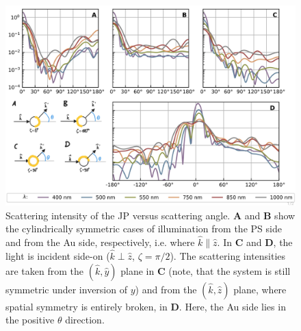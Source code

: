 \documentclass[10pt]{article}
\begin{document}
\begin{figure}[b!]
    \centering
    \includegraphics[width=\textwidth]{[fig] cartesian mieplots (placeholder).jpg}
    \caption{Scattering intensity of the JP versus scattering angle. 
    {\sffamily\bfseries A} and {\sffamily\bfseries B} show the cylindrically symmetric cases of illumination from the PS side and from the Au side, respectively, i.e. where $\hat{k}\parallel\hat{z}$. 
    In {\sffamily\bfseries C} and {\sffamily\bfseries D}, the light is incident side-on ($\hat{k}\perp\hat{z}$, $\zeta=\pi/2$).
    The scattering intensities are taken from the $(\hat{k},\hat{y})$ plane in {\sffamily\bfseries C} (note, that the system is still symmetric under inversion of $y$) and from the $(\hat{k},\hat{z})$ plane, where spatial symmetry is entirely broken, in {\sffamily\bfseries D}.
    Here, the Au side lies in the positive $\theta$ direction.  
    }
    \label{fig:jp-mieplots}
\end{figure}
\end{document}
